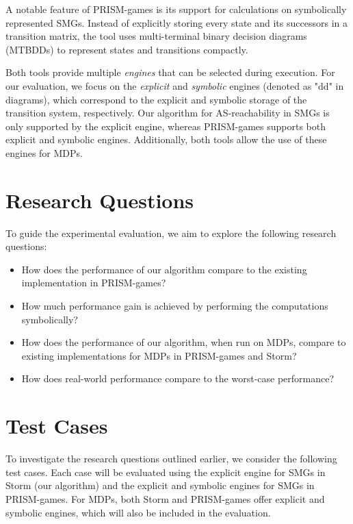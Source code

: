 A notable feature of PRISM-games is its support for calculations on symbolically represented SMGs. Instead of explicitly storing every state and its successors in a transition matrix, the tool uses multi-terminal binary decision diagrams (MTBDDs) to represent states and transitions compactly.

Both tools provide multiple \textit{engines} that can be selected during execution. For our evaluation, we focus on the \textit{explicit} and \textit{symbolic} engines (denoted as "dd" in diagrams), which correspond to the explicit and symbolic storage of the transition system, respectively. Our algorithm for AS-reachability in SMGs is only supported by the explicit engine, whereas PRISM-games supports both explicit and symbolic engines. Additionally, both tools allow the use of these engines for MDPs.


\section{Research Questions}
\label{sec:rqs}
To guide the experimental evaluation, we aim to explore the following research questions:
\begin{itemize}
    \item[\textbf{RQ1}:] How does the performance of our algorithm compare to the existing implementation in PRISM-games?
    \item[\textbf{RQ2}:] How much performance gain is achieved by performing the computations symbolically?
    \item[\textbf{RQ3}:] How does the performance of our algorithm, when run on MDPs, compare to existing implementations for MDPs in PRISM-games and Storm?
    \item[\textbf{RQ4}:] How does real-world performance compare to the worst-case performance?
\end{itemize}


\section{Test Cases}
\label{sec:test_cases}

To investigate the research questions outlined earlier, we consider the following test cases. Each case will be evaluated using the explicit engine for SMGs in Storm (our algorithm) and the explicit and symbolic engines for SMGs in PRISM-games. For MDPs, both Storm and PRISM-games offer explicit and symbolic engines, which will also be included in the evaluation.

